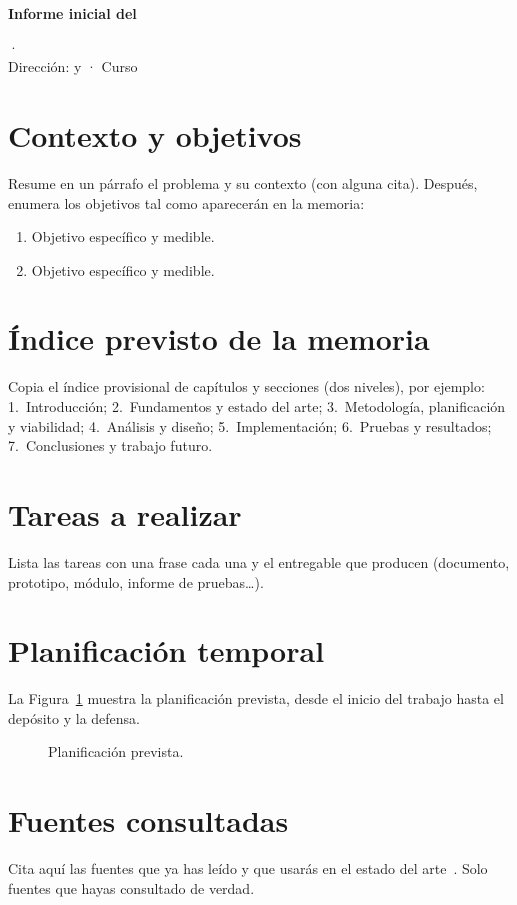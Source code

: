 \documentclass[12pt,a4paper]{article}
\begin{document}
\begin{center}
  {\Large\bfseries Informe inicial del \tfgsigla\par}\vspace{4pt}
  {\large \tfgtitulo\par}\vspace{6pt}
  \tfgautor{} · \tfgtitulacion\\
  Dirección: \tfgdirector\ifx\tfgcodirector\empty\else{} y \tfgcodirector\fi{} · Curso \tfgcurso
\end{center}

\section{Contexto y objetivos}
Resume en un párrafo el problema y su contexto (con alguna cita). Después,
enumera los objetivos tal como aparecerán en la memoria:
\begin{enumerate}[label=\textbf{O\arabic*.}]
  \item Objetivo específico y medible.
  \item Objetivo específico y medible.
\end{enumerate}

\section{Índice previsto de la memoria}
Copia el índice provisional de capítulos y secciones (dos niveles), por ejemplo:
1.~Introducción; 2.~Fundamentos y estado del arte; 3.~Metodología, planificación
y viabilidad; 4.~Análisis y diseño; 5.~Implementación; 6.~Pruebas y resultados;
7.~Conclusiones y trabajo futuro.

\section{Tareas a realizar}
Lista las tareas con una frase cada una y el entregable que producen
(documento, prototipo, módulo, informe de pruebas\ldots).

\section{Planificación temporal}
La Figura~\ref{fig:plan-inicial} muestra la planificación prevista, desde el
inicio del trabajo hasta el depósito y la defensa.

\begin{figure}[htbp]
  \centering
  
  \caption{Planificación prevista.}
  \label{fig:plan-inicial}
\end{figure}

\section{Fuentes consultadas}
Cita aquí las fuentes que ya has leído y que usarás en el estado del
arte~\cite{garcia2024movil,martin2022arquitectura}. Solo fuentes que hayas
consultado de verdad.

\printbibliography[heading=subbibliography,title={Referencias}]
\end{document}
